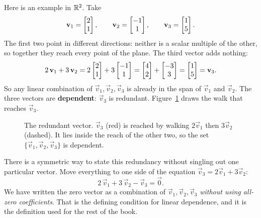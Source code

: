 Here is an example in $\mathbb{R}^2$. Take
\[
  \mathbf{v}_1 = \begin{bmatrix}2 \\ 1\end{bmatrix}, \qquad
  \mathbf{v}_2 = \begin{bmatrix}-1 \\ 1\end{bmatrix}, \qquad
  \mathbf{v}_3 = \begin{bmatrix}1 \\ 5\end{bmatrix}.
\]
The first two point in different directions: neither is a scalar multiple of the
other, so together they reach every point of the plane. The third vector adds nothing:
\[
  2\,\mathbf{v}_1 + 3\,\mathbf{v}_2
  = 2\begin{bmatrix}2\\1\end{bmatrix} + 3\begin{bmatrix}-1\\1\end{bmatrix}
  = \begin{bmatrix}4\\2\end{bmatrix} + \begin{bmatrix}-3\\3\end{bmatrix}
  = \begin{bmatrix}1\\5\end{bmatrix}
  = \mathbf{v}_3 .
\]
So any linear combination of $\vec{v}_1, \vec{v}_2, \vec{v}_3$ is already in the
span of $\vec{v}_1$ and $\vec{v}_2$. The three vectors are \textbf{dependent}:
$\vec{v}_3$ is redundant. Figure~\ref{ch14:fig-redundant} draws the walk that
reaches $\vec{v}_3$.

\begin{figure}[htbp]
\centering
{}
\caption{The redundant vector. $\vec{v}_3$ (red) is reached by walking
$2\vec{v}_1$ then $3\vec{v}_2$ (dashed). It lies inside the reach of the other
two, so the set $\{\vec{v}_1,\vec{v}_2,\vec{v}_3\}$ is dependent.}
\label{ch14:fig-redundant}
\end{figure}

There is a symmetric way to state this redundancy without singling out one
particular vector. Move everything to one side of the equation
$\vec{v}_3 = 2\vec{v}_1 + 3\vec{v}_2$:
\[
  2\,\vec{v}_1 + 3\,\vec{v}_2 - \vec{v}_3 = \vec{0}.
\]
We have written the zero vector as a combination of $\vec{v}_1,\vec{v}_2,
\vec{v}_3$ \emph{without using all-zero coefficients}. That is the defining
condition for linear dependence, and it is the definition used for
the rest of the book.


